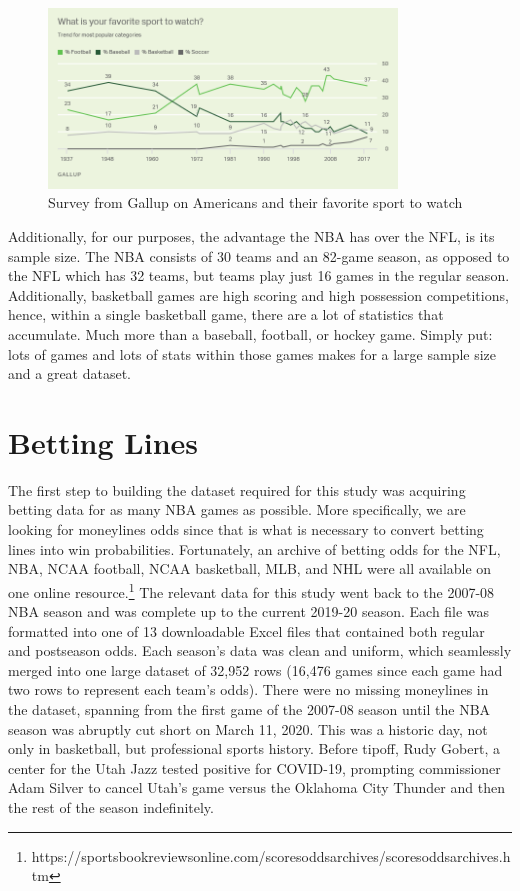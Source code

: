 \documentclass [MS] {uclathes}
\begin{document}
\begin{figure}[h]
\centering
  \includegraphics[width=350px]{fav_sports.png}
  \caption{Survey from Gallup on Americans and their favorite sport to watch}
\end{figure}

Additionally, for our purposes, the advantage the NBA has over the NFL, is its sample size. The NBA consists of 30 teams and an 82-game season, as opposed to the NFL which has 32 teams, but teams play just 16 games in the regular season. Additionally, basketball games are high scoring and high possession competitions, hence, within a single basketball game, there are a lot of statistics that accumulate. Much more than a baseball, football, or hockey game. Simply put: lots of games and lots of stats within those games makes for a large sample size and a great dataset.

\section{Betting Lines}
The first step to building the dataset required for this study was acquiring betting data for as many NBA games as possible. More specifically, we are looking for moneylines odds since that is what is necessary to convert betting lines into win probabilities. Fortunately, an archive of betting odds for the NFL, NBA, NCAA football, NCAA basketball, MLB, and NHL were all available on one online resource.\footnote{https://sportsbookreviewsonline.com/scoresoddsarchives/scoresoddsarchives.htm} The relevant data for this study went back to the 2007-08 NBA season and was complete up to the current 2019-20 season. Each file was formatted into one of 13 downloadable Excel files that contained both regular and postseason odds. Each season's data was clean and uniform, which seamlessly merged into one large dataset of 32,952 rows (16,476 games since each game had two rows to represent each team's odds). There were no missing moneylines in the dataset, spanning from the first game of the 2007-08 season until the NBA season was abruptly cut short on March 11, 2020. This was a historic day, not only in basketball, but professional sports history. Before tipoff, Rudy Gobert, a center for the Utah Jazz tested positive for COVID-19, prompting commissioner Adam Silver to cancel Utah's game versus the Oklahoma City Thunder and then the rest of the season indefinitely. \cite{nbacovid} 
\end{document}

